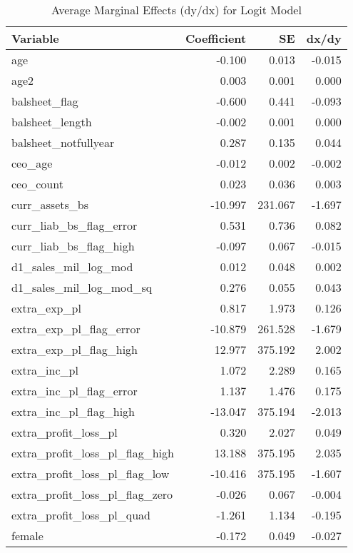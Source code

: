 \begin{table}

\caption{\label{tab:vars}Average Marginal Effects (dy/dx) for Logit Model}
\centering
\begin{tabular}[t]{l|r|r|r}
\hline
Variable & Coefficient & SE & dx/dy\\
\hline
age & -0.100 & 0.013 & -0.015\\
\hline
age2 & 0.003 & 0.001 & 0.000\\
\hline
balsheet\_flag & -0.600 & 0.441 & -0.093\\
\hline
balsheet\_length & -0.002 & 0.001 & 0.000\\
\hline
balsheet\_notfullyear & 0.287 & 0.135 & 0.044\\
\hline
ceo\_age & -0.012 & 0.002 & -0.002\\
\hline
ceo\_count & 0.023 & 0.036 & 0.003\\
\hline
curr\_assets\_bs & -10.997 & 231.067 & -1.697\\
\hline
curr\_liab\_bs\_flag\_error & 0.531 & 0.736 & 0.082\\
\hline
curr\_liab\_bs\_flag\_high & -0.097 & 0.067 & -0.015\\
\hline
d1\_sales\_mil\_log\_mod & 0.012 & 0.048 & 0.002\\
\hline
d1\_sales\_mil\_log\_mod\_sq & 0.276 & 0.055 & 0.043\\
\hline
extra\_exp\_pl & 0.817 & 1.973 & 0.126\\
\hline
extra\_exp\_pl\_flag\_error & -10.879 & 261.528 & -1.679\\
\hline
extra\_exp\_pl\_flag\_high & 12.977 & 375.192 & 2.002\\
\hline
extra\_inc\_pl & 1.072 & 2.289 & 0.165\\
\hline
extra\_inc\_pl\_flag\_error & 1.137 & 1.476 & 0.175\\
\hline
extra\_inc\_pl\_flag\_high & -13.047 & 375.194 & -2.013\\
\hline
extra\_profit\_loss\_pl & 0.320 & 2.027 & 0.049\\
\hline
extra\_profit\_loss\_pl\_flag\_high & 13.188 & 375.195 & 2.035\\
\hline
extra\_profit\_loss\_pl\_flag\_low & -10.416 & 375.195 & -1.607\\
\hline
extra\_profit\_loss\_pl\_flag\_zero & -0.026 & 0.067 & -0.004\\
\hline
extra\_profit\_loss\_pl\_quad & -1.261 & 1.134 & -0.195\\
\hline
female & -0.172 & 0.049 & -0.027\\

\end{tabular}
\end{table}
